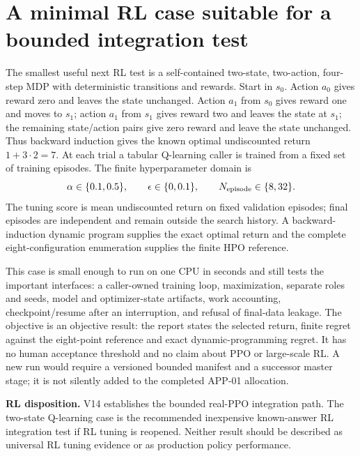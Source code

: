 \section{A minimal RL case suitable for a bounded integration test}

The smallest useful next RL test is a self-contained two-state, two-action,
four-step MDP with deterministic transitions and rewards. Start in $s_0$.
Action $a_0$ gives reward zero and leaves the state unchanged. Action $a_1$
from $s_0$ gives reward one and moves to $s_1$; action $a_1$ from $s_1$ gives
reward two and leaves the state at $s_1$; the remaining state/action pairs give
zero reward and leave the state unchanged. Thus backward induction gives the
known optimal undiscounted return $1+3\cdot2=7$. At each trial a tabular
Q-learning caller is trained from a fixed set of training episodes.
The finite hyperparameter domain is
\[
 \alpha\in\{0.1,0.5\},\qquad
 \epsilon\in\{0,0.1\},\qquad
 N_{\rm episode}\in\{8,32\}.
\]
The tuning score is mean undiscounted return on fixed validation episodes;
final episodes are independent and remain outside the search history. A
backward-induction dynamic program supplies the exact optimal return and the
complete eight-configuration enumeration supplies the finite HPO reference.

This case is small enough to run on one CPU in seconds and still tests the
important interfaces: a caller-owned training loop, maximization, separate
roles and seeds, model and optimizer-state artifacts, work accounting,
checkpoint/resume after an interruption, and refusal of final-data leakage.
The objective is an objective result: the report states the selected return,
finite regret against the eight-point reference and exact dynamic-programming
regret. It has no human acceptance threshold and no claim about PPO or
large-scale RL. A new run would require a versioned bounded manifest and a
successor master stage; it is not silently added to the completed APP-01
allocation.

\begin{decisions}
\textbf{RL disposition.} V14 establishes the bounded real-PPO integration path. The
two-state Q-learning case is the recommended inexpensive known-answer RL
integration test if RL tuning is reopened. Neither result should be described
as universal RL tuning evidence or as production policy performance.
\end{decisions}
